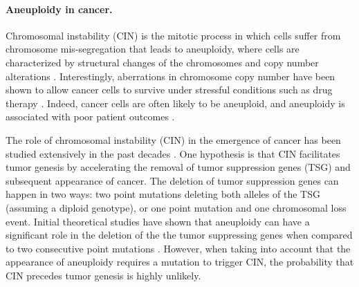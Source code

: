 \documentclass[12pt]{extarticle}
\begin{document}

\paragraph{Aneuploidy in cancer.} Chromosomal instability (CIN) is the mitotic process in which cells suffer from chromosome mis-segregation that leads to aneuploidy, where cells are characterized by structural changes of the chromosomes and copy number alterations \citep{schukken2018cin}.
Interestingly, aberrations in chromosome copy number have been shown to allow cancer cells to survive under stressful conditions such as drug therapy \citep{lukow2021chromosomal,rutledge2016selective}.
Indeed, cancer cells are often likely to be aneuploid, and aneuploidy is associated with poor patient outcomes \citep{ben2020context}.

The role of chromosomal instability (CIN) in the emergence of cancer has been studied extensively in the past decades \citep{michor2005can,christine2018understanding,nowak2002role,pavelka2010dr,komarova2003mutation,zhu2018cellular}.
One hypothesis is that CIN facilitates tumor genesis by accelerating the removal of tumor suppression genes (TSG) and subsequent appearance of cancer. The deletion of tumor suppression genes can happen in two ways: two point mutations deleting both alleles of the TSG (assuming a diploid genotype), or one point mutation and one chromosomal loss event.
Initial theoretical studies have shown that aneuploidy can have a significant role in the deletion of the the tumor suppressing genes when compared to two consecutive point mutations \citep{nowak2002role,komarova2003mutation,michor2005can,komarova2008selective}.
However, when taking into account that the appearance of aneuploidy requires a mutation to trigger CIN, the probability that CIN precedes tumor genesis is highly unlikely.
\end{document}

